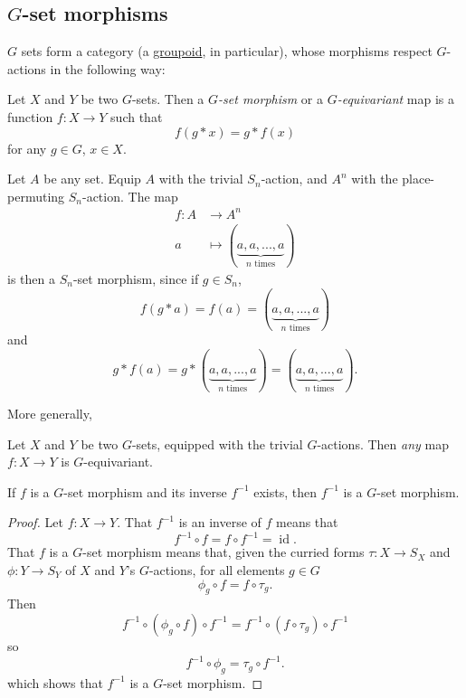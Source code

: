 \documentclass{article}
\DeclareMathOperator{\id}{id}
\begin{document}
\subsection{\texorpdfstring{$G$}{G}-set morphisms}

$G$ sets form a category (a \href{https://en.wikipedia.org/wiki/Groupoid}{groupoid}, in particular), whose morphisms respect $G$-actions in the following way:

\begin{definition}
    Let $X$ and $Y$ be two $G$-sets.
    Then a \textit{$G$-set morphism} or a \textit{$G$-equivariant} map is a function $f: X \to Y$ such that
    \[
        f(g \ast x) = g \ast f(x)
    \]
    for any $g \in G$, $x \in X$.
\end{definition}

\begin{example}
    Let $A$ be any set.
    Equip $A$ with the trivial $S_n$-action, and $A^n$ with the place-permuting $S_n$-action.
    The map 
    \begin{align*}
        f: A &\to A^n \\
        a &\mapsto \left(\underbrace{a,a,...,a}_{n\text{ times}}\right)
    \end{align*}
    is then a $S_n$-set morphism, since if $g \in S_n$,
    \[
        f(g \ast a) = f(a) = \left(\underbrace{a,a,...,a}_{n\text{ times}}\right)
    \]
    and
    \[
        g \ast f(a) = g \ast \left(\underbrace{a,a,...,a}_{n\text{ times}}\right) = \left(\underbrace{a,a,...,a}_{n\text{ times}}\right).
    \]
\end{example}

More generally,

\begin{example}
    Let $X$ and $Y$ be two $G$-sets, equipped with the trivial $G$-actions.
    Then \textit{any} map $f: X \to Y$ is $G$-equivariant.
\end{example}

\begin{proposition}
    If $f$ is a $G$-set morphism and its inverse $f^{-1}$ exists, then $f^{-1}$ is a $G$-set morphism.
\end{proposition}

\begin{proof}
    Let $f: X \to Y$.
    That $f^{-1}$ is an inverse of $f$ means that
    \[
        f^{-1} \circ f = f \circ f^{-1} = \id.
    \]
    That $f$ is a $G$-set morphism means that, given the curried forms $\tau: X \to S_X$ and $\phi: Y \to S_Y$ of $X$ and $Y$'s $G$-actions, for all elements $g \in G$
    \[
        \phi_g \circ f = f \circ \tau_g.
    \]
    Then
    \[
        f^{-1} \circ (\phi_g \circ f) \circ f^{-1} = f^{-1} \circ (f \circ \tau_g) \circ f^{-1}
    \]
    so
    \[
        f^{-1} \circ \phi_g = \tau_g \circ f^{-1}.
    \]
    which shows that $f^{-1}$ is a $G$-set morphism.
\end{proof}
\end{document}
